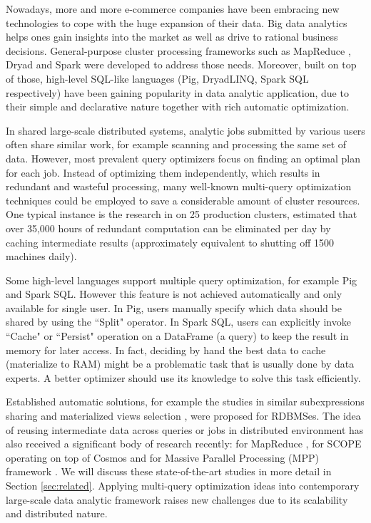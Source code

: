 Nowadays, more and more e-commerce companies have been embracing new technologies to cope with the huge expansion of their data. Big data analytics helps ones gain insights into the market as well as drive to rational business decisions. General-purpose cluster processing frameworks such as MapReduce \cite{dean2008mapreduce}, Dryad \cite{isard2007dryad} and Spark \cite{zaharia2012resilient} were developed to address those needs. Moreover, built on top of those, high-level SQL-like languages (Pig, DryadLINQ, Spark SQL respectively) have been gaining popularity in data analytic application, due to their simple and declarative nature together with rich automatic optimization.

In shared large-scale distributed systems, analytic jobs submitted by various users often share similar work, for example scanning and processing the same set of data. However, most prevalent query optimizers focus on finding an optimal plan for each job. Instead of optimizing them independently, which results in redundant and wasteful processing, many well-known multi-query optimization techniques could be employed to save a considerable amount of cluster resources. One typical instance is the research in \cite{gunda2010nectar} on 25 production clusters, estimated that over 35,000 hours of redundant computation can be eliminated per day by caching intermediate results (approximately equivalent to shutting off 1500 machines daily).

Some high-level languages support multiple query optimization, for example Pig and Spark SQL. However this feature is not achieved automatically and only available for single user. In Pig, users manually specify which data should be shared by using the ``Split" operator. In Spark SQL, users can explicitly invoke ``Cache" or ``Persist" operation on a DataFrame (a query) to keep the result in memory for later access. In fact, deciding by hand the best data to cache (materialize to RAM) might be a problematic task that is usually done by data experts. A better optimizer should use its knowledge to solve this task efficiently.

Established automatic solutions, for example the studies in similar subexpressions sharing \cite{zhou2007efficient} and materialized views selection \cite{goldstein2001optimizing, mistry2001materialized}, were proposed for RDBMSes. The idea of reusing intermediate data across queries or jobs in distributed environment has also received a significant body of research  recently: for MapReduce \cite{mrshare, mqo}, for SCOPE operating on top of Cosmos \cite{silva2012exploiting} and for Massive Parallel Processing (MPP) framework \cite{el2015optimization}. We will discuss these state-of-the-art studies in more detail in Section \ref{sec:related}. Applying multi-query optimization ideas into contemporary large-scale data analytic framework raises new challenges due to its scalability and distributed nature.


